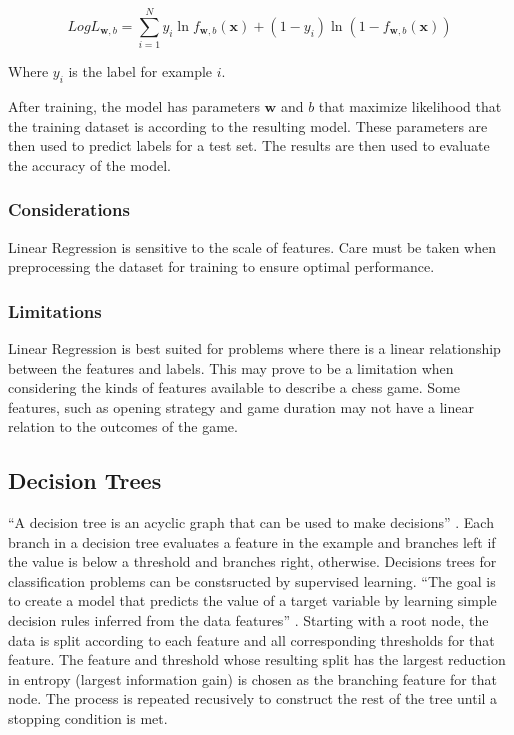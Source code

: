 \documentclass[12pt]{article}
\begin{document}
\[
LogL_{\textbf{w},b} =
\sum_{i=1}^N y_i\ln{f_{\textbf{w},b}(\textbf{x}) + (1-y_i)\ln(1 - f_{\textbf{w},b}(\textbf{x}))}
\]

\noindent Where $y_i$ is the label for example $i$.

\vspace{12pt}After training, the model has parameters $\textbf{w}$ and $b$ that maximize likelihood that the training dataset is according to the resulting model. These parameters are then used to predict labels for a test set. The results are then used to evaluate the accuracy of the model.

\subsubsection{Considerations}Linear Regression is sensitive to the scale of features. Care must be taken when preprocessing the dataset for training to ensure optimal performance.

\subsubsection{Limitations}Linear Regression is best suited for problems where there is a linear relationship between the features and labels. This may prove to be a limitation when considering the kinds of features available to describe a chess game. Some features, such as opening strategy and game duration may not have a linear relation to the outcomes of the game.

\subsection{Decision Trees}

``A decision tree is an acyclic graph that can be used to make decisions'' \cite[Chapter 3, Section 3.3]{100MLB}. Each branch in a decision tree evaluates a feature in the example and branches left if the value is below a threshold and branches right, otherwise. Decisions trees for classification problems can be constsructed by supervised learning. ``The goal is to create a model that predicts the value of a target variable by learning simple decision rules inferred from the data features'' \cite{sklearnDT}. Starting with a root node, the data is split according to each feature and all corresponding thresholds for that feature. The feature and threshold whose resulting split has the largest reduction in entropy (largest information gain) is chosen as the branching feature for that node. The process is repeated recusively to construct the rest of the tree until a stopping condition is met.
\end{document}

